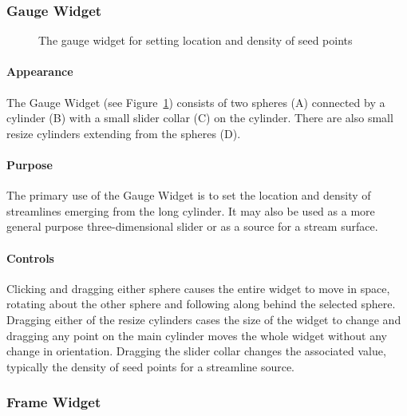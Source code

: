 \subsubsection{Gauge Widget}
\label{sec:view-gaugewidget} 

\begin{figure}[htb]
  \begin{makeimage}
  \end{makeimage}
  \gaugewidget
  \caption{\label{fig:gaugewidget} The gauge widget for setting location and
    density of seed points}
\end{figure}

\paragraph{Appearance} The Gauge
Widget (see Figure~\ref{fig:gaugewidget}) consists of two spheres (A) connected by a cylinder (B) with a
small slider collar (C) on the cylinder.  There are also small resize
cylinders extending from the spheres (D).

\paragraph{Purpose} The primary use of the Gauge Widget is to set the
location and density of streamlines emerging from the long cylinder.  It
may also be used as a more general purpose three-dimensional slider or as a
source for a stream surface. 

\paragraph{Controls} Clicking and dragging either sphere causes the
entire widget to move in space, rotating about the other sphere and
following along behind the selected sphere.  Dragging either of the resize
cylinders cases the size of the widget to change and dragging any point on
the main cylinder moves the whole widget without any change in orientation.
Dragging the slider collar changes the associated value, typically the
density of seed points for a streamline source.

\subsubsection{Frame Widget}
\label{sec:view-framewidget} 

